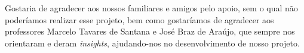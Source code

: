 \begin{agradecimentos}
Gostaria de agradecer aos nossos familiares e amigos pelo apoio, sem o qual não poderíamos realizar esse projeto, bem como gostaríamos de agradecer aos professores Marcelo Tavares de Santana e José Braz de Araújo, que sempre nos orientaram e deram \textit{insights}, ajudando-nos no desenvolvimento de nosso projeto.

\end{agradecimentos}
